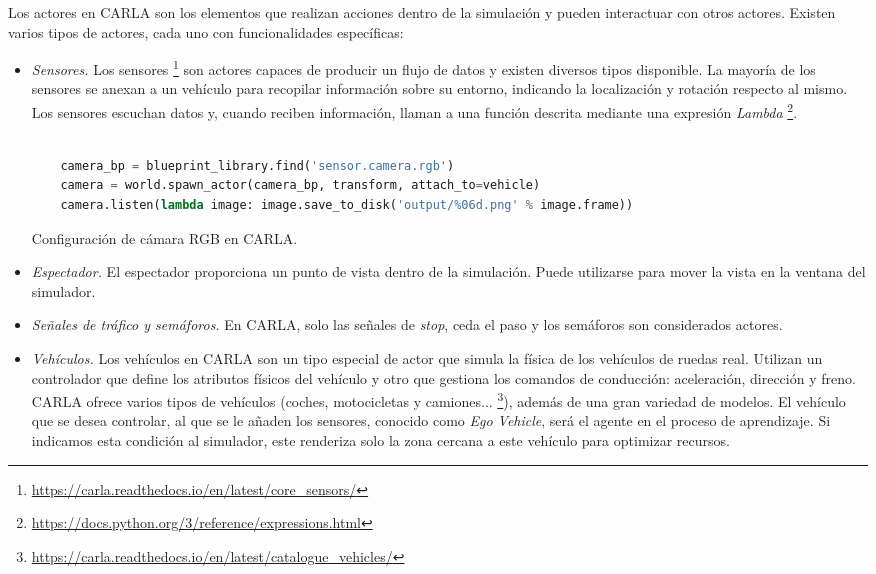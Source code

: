 Los actores en CARLA son los elementos que realizan acciones dentro de la simulación y pueden interactuar con otros actores. Existen varios tipos de actores, cada uno con funcionalidades específicas:

\begin{itemize}
\item \textit{Sensores.} Los sensores \footnote{\url{https://carla.readthedocs.io/en/latest/core_sensors/}} son actores capaces de producir un flujo de datos y existen diversos tipos disponible. La mayoría de los sensores se anexan a un vehículo para recopilar información sobre su entorno, indicando la localización y rotación respecto al mismo. Los sensores escuchan datos y, cuando reciben información, llaman a una función descrita mediante una expresión \textit{Lambda} \footnote{\url{https://docs.python.org/3/reference/expressions.html}}. 

	\begin{code}[h]
	\begin{lstlisting}[language=python]
	
	camera_bp = blueprint_library.find('sensor.camera.rgb')
	camera = world.spawn_actor(camera_bp, transform, attach_to=vehicle)
	camera.listen(lambda image: image.save_to_disk('output/%06d.png' % image.frame))

	\end{lstlisting}
	\caption[Configuración de cámara RGB en CARLA]{Configuración de cámara RGB en CARLA.}
	\label{cod:camara_carla}
	\end{code}


\item \textit{Espectador.} El espectador proporciona un punto de vista dentro de la simulación. Puede utilizarse para mover la vista en la ventana del simulador.
\item \textit{Señales de tráfico y semáforos.} En CARLA, solo las señales de \textit{stop}, ceda el paso y los semáforos son considerados actores.

\item \textit{Vehículos.} Los vehículos en CARLA son un tipo especial de actor que simula la física de los vehículos de ruedas real. Utilizan un controlador que define los atributos físicos del vehículo y otro que gestiona los comandos de conducción: aceleración, dirección y freno. CARLA ofrece varios tipos de vehículos (coches, motocicletas y camiones... \footnote{\url{https://carla.readthedocs.io/en/latest/catalogue_vehicles/}}), además de una gran variedad de modelos. El vehículo que se desea controlar, al que se le añaden los sensores, conocido como \textit{Ego Vehicle}, será el agente en el proceso de aprendizaje. Si indicamos esta condición al simulador, este renderiza solo la zona cercana a este vehículo para optimizar recursos.


\end{itemize}
